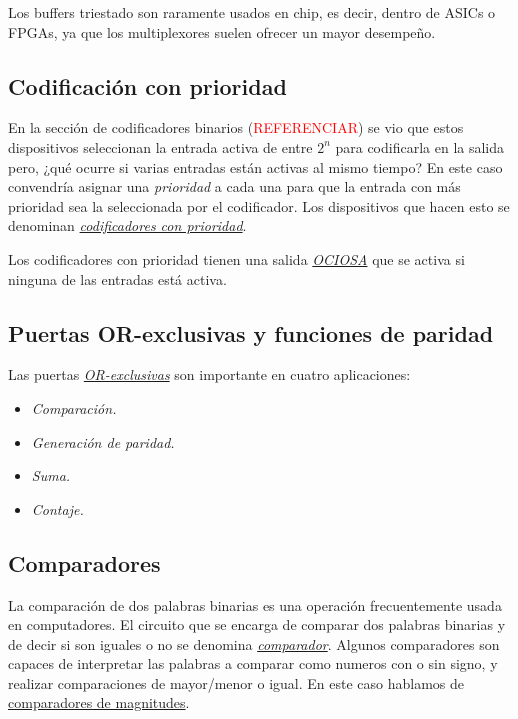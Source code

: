 Los buffers triestado son raramente usados en chip, es decir, dentro de ASICs o FPGAs, ya que los multiplexores suelen ofrecer un mayor desempeño.

\subsection{Codificación con prioridad}
En la sección de codificadores binarios (\textcolor{red}{REFERENCIAR}) se vio que estos dispositivos seleccionan la entrada activa de entre $2^n$ para codificarla en la salida pero, ¿qué ocurre si varias entradas están activas al mismo tiempo? En este caso convendría asignar una \emph{prioridad} a cada una para que la entrada con más prioridad sea la seleccionada por el codificador. Los dispositivos que hacen esto se denominan \hyperlink{priority_encoder}{\emph{codificadores con prioridad}}.

Los codificadores con prioridad tienen una salida \hyperlink{IDLE}{\emph{OCIOSA}} que se activa si ninguna de las entradas está activa.

\subsection{Puertas OR-exclusivas y funciones de paridad}

Las puertas \hyperlink{exclusive-OR}{\emph{OR-exclusivas}} son importante en cuatro aplicaciones:

\begin{itemize}
    \item \emph{Comparación.}
    \item \emph{Generación de paridad.}
    \item \emph{Suma.}
    \item \emph{Contaje.}
\end{itemize}

\subsection{Comparadores}
La comparación de dos palabras binarias es una operación frecuentemente usada en computadores. El circuito que se encarga de comparar dos palabras binarias y de decir si son iguales o no se denomina \hyperlink{comparator}{\emph{comparador}}. Algunos comparadores son capaces de interpretar las palabras a comparar como numeros con o sin signo, y realizar comparaciones de mayor/menor o igual. En este caso hablamos de \hyperlink{magnitude_comparator}{comparadores de magnitudes}.

